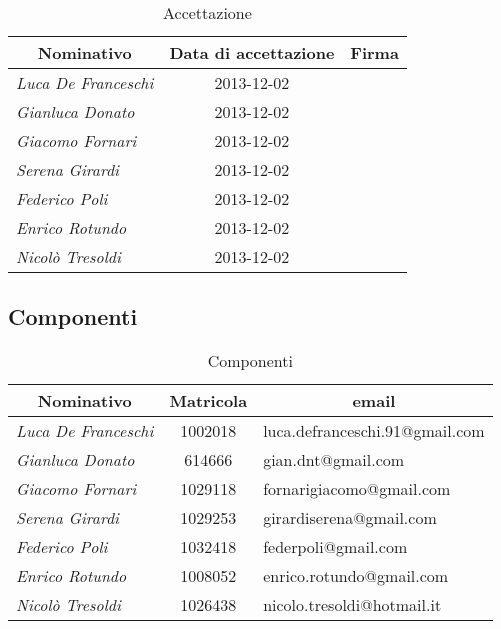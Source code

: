 	\begin{table}[h]
	\begin{adjustwidth}{-4cm}{-4cm}
	\centering
	\begin{tabular}{ l c l }
	\hline
	\multicolumn{1}{c}{\textbf{Nominativo}} & \multicolumn{1}{c}{\textbf{Data di accettazione}} & \multicolumn{1}{c}{\textbf{Firma}} \\
	\hline
	\textit{Luca De Franceschi} & 2013-12-02 & \hspace{5cm} \\
	\textit{Gianluca Donato} & 2013-12-02 & \hspace{5cm} \\
	\textit{Giacomo Fornari} & 2013-12-02 & \hspace{5cm} \\
	\textit{Serena Girardi} & 2013-12-02 & \hspace{5cm} \\
	\textit{Federico Poli} & 2013-12-02 & \hspace{5cm} \\
	\textit{Enrico Rotundo} & 2013-12-02 & \hspace{5cm} \\
	\textit{Nicolò Tresoldi} & 2013-12-02 & \hspace{5cm} \\
	\hline
	\end{tabular}
	\caption{Accettazione}
	\end{adjustwidth}
	\end{table}
	
	\clearpage	
	
	\subsection{Componenti}
	
	\def\arraystretch{1.1}
	\begin{table}[h]
	\centering
	\begin{tabular}{ l c l }
	\hline
	\multicolumn{1}{c}{\textbf{Nominativo}} & \multicolumn{1}{c}{\textbf{Matricola}} & \multicolumn{1}{c}{\textbf{email}} \\
	\hline
	\textit{Luca De Franceschi} & 1002018 & luca.defranceschi.91@gmail.com \\
	\textit{Gianluca Donato} & 614666 & gian.dnt@gmail.com \\
	\textit{Giacomo Fornari} & 1029118 & fornarigiacomo@gmail.com \\
	\textit{Serena Girardi} & 1029253 & girardiserena@gmail.com \\
	\textit{Federico Poli} & 1032418 & federpoli@gmail.com \\
	\textit{Enrico Rotundo} & 1008052 & enrico.rotundo@gmail.com \\
	\textit{Nicolò Tresoldi} & 1026438 & nicolo.tresoldi@hotmail.it \\
	\hline
	\end{tabular}
	\caption{Componenti}
	\end{table}
	